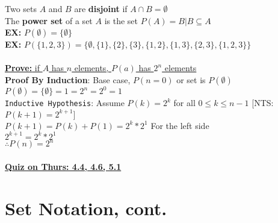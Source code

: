 \documentclass{article}
\begin{document}
		Two sets $A$ and $B$ are \textbf{disjoint} if $A\cap B = \emptyset$\\
		The \textbf{power set} of a set $A$ is the set $P(A)={B|B\subseteq A}$\\
		\textbf{EX:} $P(\emptyset )= \lbrace\emptyset\rbrace$\\
		\textbf{EX:} $P(\lbrace 1,2,3\rbrace )=\lbrace\emptyset ,\lbrace 1\rbrace ,\lbrace 2\rbrace ,\lbrace 3\rbrace ,\lbrace 1,2\rbrace ,\lbrace 1,3\rbrace ,\lbrace 2,3\rbrace ,\lbrace 1,2,3\rbrace\rbrace$\\ \\
		\underline{\textbf{Prove:} if $A$ has $n$ elements, $P(a)$ has $2^n$ elements}\\
		\textbf{Proof By Induction}: Base case, $P(n=0)$ or set is $P(\emptyset )$\\
		$P(\emptyset )= \lbrace \emptyset \rbrace = 1 = 2^n = 2^0 = 1$\\
		\texttt{Inductive Hypothesis}: Assume $P(k)=2^k$ for all $0\leq k\leq n-1$ [NTS: $P(k+1)=2^{k+1}]$\\
		$P(k+1)=P(k)+P(1)=2^k*2^1$ For the left side\\
		$2^{k+1} = 2^k*2^1$\\
		$\therefore P(n)=2^n$ 
		\\
		\\
		\textbf{\underline{Quiz on Thurs: 4.4, 4.6, 5.1}}\\
		\section[04/03/18]{Set Notation, cont.}
\end{document}
